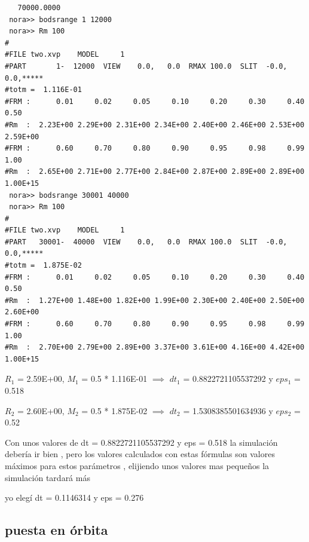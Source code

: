 \documentclass[12pt]{article} %
\renewcommand{\=}[1]{\stackrel{#1}{=}} %
\theoremstyle{definition}
\theoremstyle{remark}
\begin{document}
\begin{description}
\begin{description}
\begin{verbatim}
   70000.0000    
 nora>> bodsrange 1 12000
 nora>> Rm 100
#
#FILE two.xvp    MODEL     1                                                    
#PART       1-  12000  VIEW    0.0,   0.0  RMAX 100.0  SLIT  -0.0, 0.0,*****    
#totm =  1.116E-01
#FRM :      0.01     0.02     0.05     0.10     0.20     0.30     0.40     0.50
#Rm  :  2.23E+00 2.29E+00 2.31E+00 2.34E+00 2.40E+00 2.46E+00 2.53E+00 2.59E+00
#FRM :      0.60     0.70     0.80     0.90     0.95     0.98     0.99     1.00
#Rm  :  2.65E+00 2.71E+00 2.77E+00 2.84E+00 2.87E+00 2.89E+00 2.89E+00 1.00E+15
 nora>> bodsrange 30001 40000
 nora>> Rm 100
#
#FILE two.xvp    MODEL     1                                                    
#PART   30001-  40000  VIEW    0.0,   0.0  RMAX 100.0  SLIT  -0.0, 0.0,*****    
#totm =  1.875E-02
#FRM :      0.01     0.02     0.05     0.10     0.20     0.30     0.40     0.50
#Rm  :  1.27E+00 1.48E+00 1.82E+00 1.99E+00 2.30E+00 2.40E+00 2.50E+00 2.60E+00
#FRM :      0.60     0.70     0.80     0.90     0.95     0.98     0.99     1.00
#Rm  :  2.70E+00 2.79E+00 2.89E+00 3.37E+00 3.61E+00 4.16E+00 4.42E+00 1.00E+15

\end{verbatim}

\normalsize
\item $R_1$ = 2.59E+00, $M_1$ = 0.5 * 1.116E-01 $\implies$ $dt_1$ = 0.8822721105537292 y $eps_1$ = 0.518
\item $R_2$ = 2.60E+00, $M_2$ = 0.5 * 1.875E-02 $\implies$ $dt_2$ = 1.5308385501634936 y $eps_2$ = 0.52
\item Con unos valores de dt = 0.8822721105537292 y eps = 0.518 la simulación debería ir bien , pero los valores calculados con estas fórmulas  son valores máximos para estos  parámetros , elijiendo unos valores mas pequeños la simulación tardará más
\item yo elegí dt = 0.1146314 y eps = 0.276

\end{description}

\end{description}

\subsection*{puesta en órbita}
\end{document}

